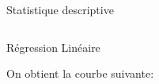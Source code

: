 \documentclass[final]{beamer}
\newlength{\onecolwid}
\newlength{\twocolwid}
\begin{document}
\begin{frame}[t]
\begin{columns}[t]
\begin{column}{\twocolwid}
\begin{columns}[t,totalwidth=\twocolwid]
\begin{column}{\onecolwid}
\begin{block}{Statistique descriptive}
\end{block}


\end{column} %

\end{columns} %


\vspace*{1em}



\begin{columns}[t,totalwidth=\twocolwid] %

\begin{column}{\onecolwid} %


\begin{block}{Régression Linéaire}

On obtient la courbe suivante:

\vspace*{75px}



\end{block}
\end{column}
\end{columns}
\end{column}
\end{columns}
\end{frame}
\end{document}
